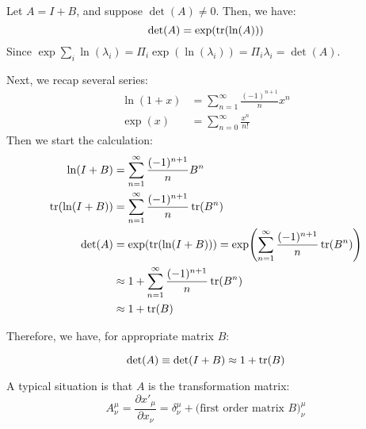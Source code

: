     Let $A = I + B$, and suppose $\det(A)\neq
    0$. Then, we have:
    \begin{equation}
        \det(A) = \exp(\tr(\ln(A)))
    \end{equation}
    Since $\exp{\sum_i \ln(\lambda_i)} = \Pi_i \exp(\ln(\lambda_i))=\Pi_i
    \lambda_i=\det(A)$.

    Next, we recap several series:
    \begin{align*}
        \ln(1+x) &= \sum_{n=1}^{\infty} \frac{(-1)^{n+1}}{n}x^n \\
        \exp(x) &= \sum_{n=0}^{\infty} \frac{x^n}{n!}
    \end{align*}
    Then we start the calculation:
    \begin{align*}
        \ln(I+B) &= \sum_{n=1}^{\infty} \frac{(-1)^{n+1}}{n}B^n \\
        \tr(\ln(I+B)) &= \sum_{n=1}^{\infty} \frac{(-1)^{n+1}}{n}\tr(B^n) \\
        \det(A) &= \exp(\tr(\ln(I+B))) 
            = \exp(\sum_{n=1}^{\infty} \frac{(-1)^{n+1}}{n}\tr(B^n)) \\
            &\approx 1+ \sum_{n=1}^{\infty} \frac{(-1)^{n+1}}{n}\tr(B^n) \\
            &\approx 1+ \tr(B)
    \end{align*}

    Therefore, we have, for appropriate matrix $B$:
    \begin{thm}
    \begin{equation}
        \det(A) \equiv \det(I+B) \approx 1+\tr(B)
    \end{equation}
    \end{thm}
    
    A typical situation is that $A$ is the transformation matrix:
    \begin{equation}
        A^\mu_\nu = \frac{\partial x'_\mu}{\partial x_\nu} 
        = \delta^\mu_\nu + \text{(first order matrix $B$)}^\mu_\nu
    \end{equation}
